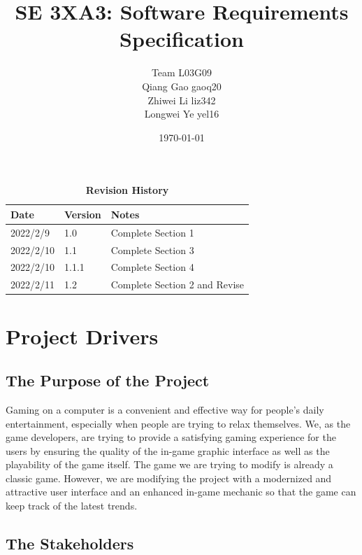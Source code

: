 \documentclass[12pt, titlepage]{article}
\title{SE 3XA3: Software Requirements Specification\cite{website:doc-template}}
\author{Team L03G09
		\\ Qiang Gao gaoq20
		\\ Zhiwei Li liz342
		\\ Longwei Ye yel16
}
\date{\today}
\begin{document}
\maketitle


\tableofcontents
\listoftables
\listoffigures

\begin{table}[!htbp]
\caption{\bf Revision History}
\begin{tabularx}{\textwidth}{p{3cm}p{2cm}X}
\toprule {\bf Date} & {\bf Version} & {\bf Notes}\\
\midrule
2022/2/9  & 1.0   & Complete Section 1\\
2022/2/10 & 1.1   & Complete Section 3\\
2022/2/10 & 1.1.1 & Complete Section 4\\
2022/2/11 & 1.2   & Complete Section 2 and Revise\\
\bottomrule
\end{tabularx}
\end{table}

\newpage


\section{Project Drivers}

\subsection{The Purpose of the Project}
Gaming on a computer is a convenient and effective way for people's daily entertainment, especially when people are trying to relax themselves. 
We, as the game developers, are trying to provide a satisfying gaming experience for the users by ensuring the quality of the in-game graphic interface as well as the playability of the game itself. The game we are trying to modify is already a classic game. However, we are modifying the project with a modernized and attractive user interface and an enhanced in-game mechanic so that the game can keep track of the latest trends.


\subsection{The Stakeholders}
\end{document}
